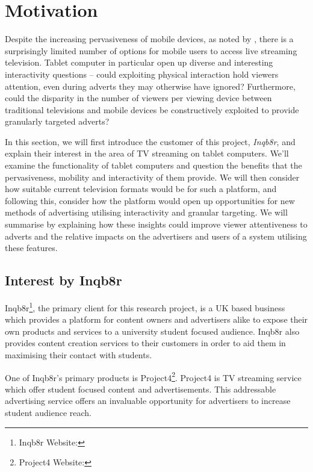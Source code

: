 \section{Motivation}
	Despite the increasing pervasiveness of mobile devices, as noted by \citet{socialTV}, there is a surprisingly limited number of options for mobile users to access live streaming television. Tablet computer in particular open up diverse and interesting interactivity questions -- could exploiting physical interaction hold viewers attention, even during adverts they may otherwise have ignored? Furthermore, could the disparity in the number of viewers per viewing device between traditional televisions and mobile devices be constructively exploited to provide granularly targeted adverts?

	In this section, we will first introduce the customer of this project, \textit{Inqb8r}, and explain their interest in the area of TV streaming on tablet computers. We'll examine the functionality of tablet computers and question the benefits that the pervasiveness, mobility and interactivity of them provide. We will then consider how suitable current television formats would be for such a platform, and following this, consider how the platform would open up opportunities for new methods of advertising utilising interactivity and granular targeting. We will summarise by explaining how these insights could improve viewer attentiveness to adverts and the relative impacts on the advertisers and users of a system utilising these features.


\subsection{Interest by Inqb8r}

	Inqb8r\footnote{Inqb8r Website: }, the primary client for this research project, is a UK based business which provides a platform for content owners and advertisers alike to expose their own products and services to a university student focused audience. Inqb8r also provides content creation services to their customers in order to aid them in maximising their contact with students.
	
	One of Inqb8r's primary products is Project4\footnote{Project4 Website: }. Project4 is TV streaming service which offer student focused content and advertisements. This addressable advertising service offers an invaluable opportunity for advertisers to increase student audience reach.
	
